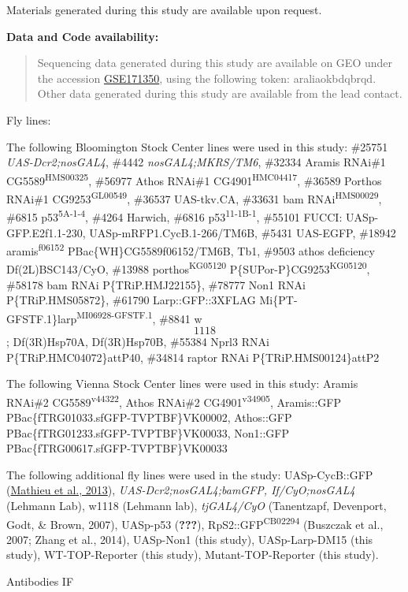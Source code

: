 \documentclass[12pt,twoside]{reedthesis}
\begin{document}
Materials generated during this study are available upon request.

\textbf{Data and Code availability:}
\begin{quote}
Sequencing data generated during this study are available on GEO under
the accession
\href{https://www.ncbi.nlm.nih.gov/geo/query/acc.cgi?acc=GSE171350}{GSE171350},
using the following token: araliaokbdqbrqd. Other data generated
during this study are available from the lead contact.
\end{quote}
{Fly lines:}

The following Bloomington Stock Center lines were used in this study:
\#25751 \emph{UAS-Dcr2;nosGAL4}, \#4442 \emph{nosGAL4;MKRS/TM6}, \#32334 Aramis
RNAi\#1 CG5589\textsuperscript{HMS00325}, \#56977 Athos RNAi\#1 CG4901\textsuperscript{HMC04417},
\#36589 Porthos RNAi\#1 CG9253\textsuperscript{GL00549}, \#36537 UAS-tkv.CA, \#33631 bam
RNAi\textsuperscript{HMS00029}, \#6815 p53\textsuperscript{5A-1-4}, \#4264 Harwich, \#6816 p53\textsuperscript{11-1B-1},
\#55101 FUCCI: UASp-GFP.E2f1.1-230, UASp-mRFP1.CycB.1-266/TM6B, \#5431
UAS-EGFP, \#18942 aramis\textsuperscript{f06152} PBac\{WH\}CG5589f06152/TM6B, Tb1, \#9503
athos deficiency Df(2L)BSC143/CyO, \#13988 porthos\textsuperscript{KG05120}
P\{SUPor-P\}CG9253\textsuperscript{KG05120}, \#58178 bam RNAi P\{TRiP.HMJ22155\}, \#78777
Non1 RNAi P\{TRiP.HMS05872\}, \#61790 Larp::GFP::3XFLAG
Mi\{PT-GFSTF.1\}larp\textsuperscript{MI06928-GFSTF.1}, \#8841 w\[1118\]; Df(3R)Hsp70A,
Df(3R)Hsp70B, \#55384 Nprl3 RNAi P\{TRiP.HMC04072\}attP40, \#34814 raptor
RNAi P\{TRiP.HMS00124\}attP2

The following Vienna Stock Center lines were used in this study: Aramis
RNAi\#2 CG5589\textsuperscript{v44322}, Athos RNAi\#2 CG4901\textsuperscript{v34905}, Aramis::GFP
PBac\{fTRG01033.sfGFP-TVPTBF\}VK00002, Athos::GFP
PBac\{fTRG01233.sfGFP-TVPTBF\}VK00033, Non1::GFP
PBac\{fTRG00617.sfGFP-TVPTBF\}VK00033

The following additional fly lines were used in the study:
UASp-CycB::GFP (\href{https://www.ncbi.nlm.nih.gov/pmc/articles/PMC5830152/\#R25}{Mathieu et al.,
2013}),
\emph{UAS-Dcr2;nosGAL4;bamGFP, If/CyO;nosGAL4} (Lehmann Lab), w1118 (Lehmann
lab),
\emph{tjGAL4/CyO} (Tanentzapf, Devenport, Godt, \& Brown, 2007),
UASp-p53 ({\textbf{???}}), RpS2::GFP\textsuperscript{CB02294}
(Buszczak et al., 2007; Zhang et al., 2014), UASp-Non1 (this
study), UASp-Larp-DM15 (this study), WT-TOP-Reporter (this study),
Mutant-TOP-Reporter (this study).

{Antibodies IF}
\end{document}

